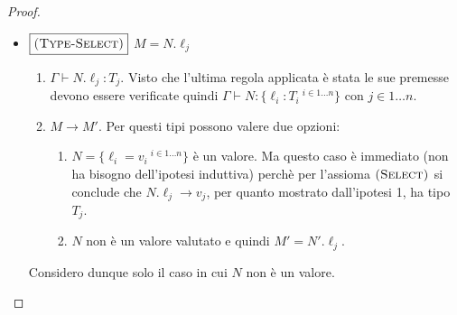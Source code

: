 \begin{proof}
\begin{itemize}
\begin{itemize}
		Visto che $M$ non \`e un valore, l'unica regola che fa ridurre un $M$ di tipo
		$ \{\ell_i : M_i\ ^{i \in 1 \dots n} \}$ \`e:
		$$
		{\myrule{Eval-Record}}
		{M_j \longrightarrow M_j'}
		{
			\{\ell_i = v_i\ ^{i \in 1 \dots j-1}, \ell_j = M_j, \ell_p = M_p\ ^{p \in j+1 \dots n}\}
			\longrightarrow 
			\{\ell_i = v_i\ ^{i \in 1 \dots j-1}, \ell_j = M_j', \ell_p = M_p\ ^{p \in j+1 \dots n}\}
		}
		$$
		Siccome il giudizio $\Gamma \vdash M_j : T_j$ \`e pi\`u corto di un passo rispetto
		a $\Gamma \vdash M_j : T_j$ e $M_j \longrightarrow M_j'$,
		allora per ipotesi induttiva concludo che $\Gamma \vdash M_j' : T_j$.
		Ora devo dimostrare che
		$\{\ell_i = v_i\ ^{i \in 1 \dots j-1}, \ell_j = M_j', \ell_p = M_p\ ^{p \in j+1 \dots n}\}$ ha tipo $T$.
		Dal momento che $M' = \{\ell_i : v_i\ ^{i \in 1 \dots j-1}, \ell_j : M'_j, \ell_p : M_p\ ^{p \in j+1 \dots m}\}$ posso applicare la regola di tipo  per derivare il giudizio $\Gamma \vdash M' : T$ con $T = \{ \ell_i : T_i \:^{i \in 1 \ldots n} \}$.
		Sono infatti soddisfatte le premesse della regola perch\`e i termini $M_i$ associati alle $\ell_i$ con $i \in 1 \ldots n,\: i \neq j$ non sono cambiati e quindi anche il loro tipo non \`e cambiato, mentre per ipotesi induttiva $\Gamma \vdash M'_j : T_j$.
		La tesi \`e quindi provata.

		\item $\boxed{\textsc{(Type-Select)}}$ $M = N.\ell_j$
		\begin{enumerate}
			\item $\Gamma \vdash N.\ell_j : T_j$. Visto che l'ultima regola applicata \`e stata  le sue premesse devono essere
			verificate quindi $\Gamma \vdash N : \{\ell_i : T_i\ ^{i \in 1 \dots n} \}$ con $j \in 1 \dots n$.
			\item $M \longrightarrow M'$. Per questi tipi possono valere due opzioni:
				\begin{enumerate}[label=\alph*)]
					\item $N = \{\ell_i = v_i\ ^{i \in 1 \dots n} \}$ \`e un valore. Ma questo
					caso \`e immediato (non ha bisogno dell'ipotesi induttiva) perch\`e per
					l'assioma $\textsc{(Select)}$ si conclude che $N.\ell_j \longrightarrow v_j$,
					per quanto mostrato dall'ipotesi 1, ha tipo $T_j$.
					\item $N$ non \`e un valore valutato e quindi $M'= N'.\ell_j$.
				\end{enumerate} 
		\end{enumerate}
		Considero dunque solo il caso in cui $N$ non \`e un valore.
		

\end{itemize}
\end{itemize}
\end{proof}
